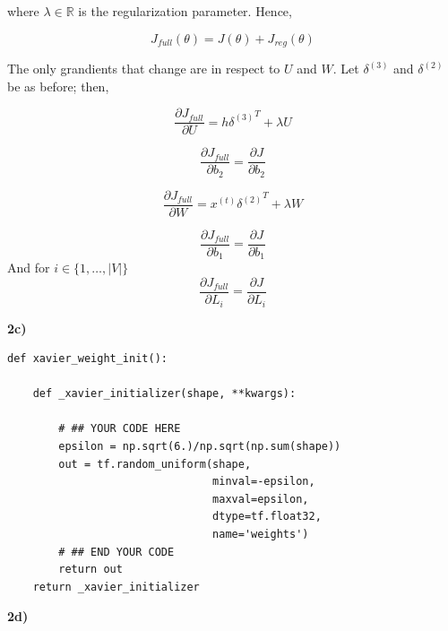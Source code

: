 \documentclass{article}
\begin{document}
where $\lambda \in \mathbb{R}$ is the regularization parameter. Hence,

\begin{equation}\label{eq:17}
J_{full}(\theta) =J(\theta) + J_{reg}(\theta)
\end{equation}

The only grandients that change are in respect to $U$ and $W$. Let $\delta^{(3)}$ and $\delta^{(2)}$ be as before; then,

\begin{equation}\label{eq:18}
\frac{\partial J_{full}}{\partial  U} = {h \delta^{(3)}}^{T} + \lambda U 
\end{equation}

\begin{equation}\label{eq:19}
\frac{\partial J_{full}}{\partial  b_{2}} =  \frac{\partial J}{\partial  b_{2}}
\end{equation}

\begin{equation}\label{eq:20}
\frac{\partial J_{full}}{\partial  W} = {x^{(t)} \delta^{(2)}}^{T} + \lambda W 
\end{equation}

\begin{equation}\label{eq:21}
\frac{\partial J_{full}}{\partial  b_{1}} =  \frac{\partial J}{\partial  b_{1}} 
\end{equation}
And for $i \in \{1, \dots, |V|\}$
\begin{equation}\label{eq:22}
\frac{\partial J_{full}}{\partial  L_{i}} =  \frac{\partial J}{\partial  L_{i}} 
\end{equation}

\textbf{2c)}
\begin{verbatim}
def xavier_weight_init():
    
    def _xavier_initializer(shape, **kwargs):
        
        # ## YOUR CODE HERE
        epsilon = np.sqrt(6.)/np.sqrt(np.sum(shape))
        out = tf.random_uniform(shape,
                                minval=-epsilon,
                                maxval=epsilon,
                                dtype=tf.float32,
                                name='weights')
        # ## END YOUR CODE
        return out
    return _xavier_initializer

\end{verbatim}

\textbf{2d)}
\end{document}
